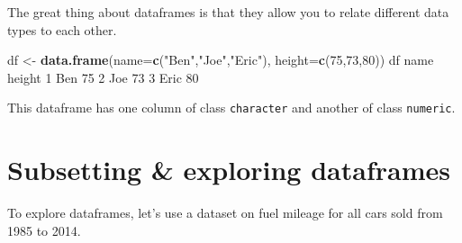 \documentclass[
]{book}
\newenvironment{Shaded}{\begin{snugshade}}{\end{snugshade}}
\newcommand{\DataTypeTok}[1]{\textcolor[rgb]{0.13,0.29,0.53}{#1}}
\newcommand{\DecValTok}[1]{\textcolor[rgb]{0.00,0.00,0.81}{#1}}
\newcommand{\KeywordTok}[1]{\textcolor[rgb]{0.13,0.29,0.53}{\textbf{#1}}}
\newcommand{\NormalTok}[1]{#1}
\newcommand{\StringTok}[1]{\textcolor[rgb]{0.31,0.60,0.02}{#1}}
\begin{document}
The great thing about dataframes is that they allow you to relate different data types to each other.

\begin{Shaded}
\begin{Highlighting}[]
\NormalTok{df <-}\StringTok{ }\KeywordTok{data.frame}\NormalTok{(}\DataTypeTok{name=}\KeywordTok{c}\NormalTok{(}\StringTok{"Ben"}\NormalTok{,}\StringTok{"Joe"}\NormalTok{,}\StringTok{"Eric"}\NormalTok{),}
                 \DataTypeTok{height=}\KeywordTok{c}\NormalTok{(}\DecValTok{75}\NormalTok{,}\DecValTok{73}\NormalTok{,}\DecValTok{80}\NormalTok{))}
\NormalTok{df}
\NormalTok{  name height}
\DecValTok{1}\NormalTok{  Ben     }\DecValTok{75}
\DecValTok{2}\NormalTok{  Joe     }\DecValTok{73}
\DecValTok{3}\NormalTok{ Eric     }\DecValTok{80}
\end{Highlighting}
\end{Shaded}

This dataframe has one column of class \texttt{character} and another of class \texttt{numeric}.

\hypertarget{subsetting-exploring-dataframes}{%
\section*{Subsetting \& exploring dataframes}\label{subsetting-exploring-dataframes}}

To explore dataframes, let's use a dataset on fuel mileage for all cars sold from 1985 to 2014.
\end{document}
